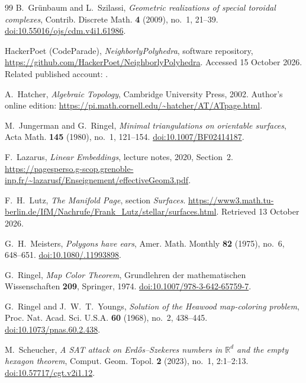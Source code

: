 \documentclass[11pt,reqno]{amsart}
\theoremstyle{plain}
\theoremstyle{definition}
\newcommand{\RR}{\mathbb{R}}
\begin{document}
\begin{thebibliography}{99}
B.~Grünbaum and L.~Szilassi,
\emph{Geometric realizations of special toroidal complexes},
Contrib. Discrete Math. \textbf{4} (2009), no.~1, 21--39.
\href{https://doi.org/10.55016/ojs/cdm.v4i1.61986}{doi:10.55016/ojs/cdm.v4i1.61986}.

HackerPoet (CodeParade), \emph{NeighborlyPolyhedra}, software repository,\newline
\url{https://github.com/HackerPoet/NeighborlyPolyhedra}.
Accessed 15 October 2026. Related published account: \cite{BokowskiKevin2025}.

A.~Hatcher, \emph{Algebraic Topology}, Cambridge University Press, 2002.
Author's online edition: \url{https://pi.math.cornell.edu/~hatcher/AT/ATpage.html}.

M.~Jungerman and G.~Ringel,
\emph{Minimal triangulations on orientable surfaces},
Acta Math. \textbf{145} (1980), no.~1, 121--154.
\href{https://doi.org/10.1007/BF02414187}{doi:10.1007/BF02414187}.

F.~Lazarus, \emph{Linear Embeddings}, lecture notes, 2020, Section~2.
\url{https://pagesperso.g-scop.grenoble-inp.fr/~lazarusf/Enseignement/effectiveGeom3.pdf}.

F.~H.~Lutz, \emph{The Manifold Page}, section \emph{Surfaces}.
\url{https://www3.math.tu-berlin.de/IfM/Nachrufe/Frank_Lutz/stellar/surfaces.html}.
Retrieved 13 October 2026.

G.~H.~Meisters, \emph{Polygons have ears},
Amer. Math. Monthly \textbf{82} (1975), no.~6, 648--651.
\href{https://doi.org/10.1080/00029890.1975.11993898}{doi:10.1080/.11993898}.

G.~Ringel, \emph{Map Color Theorem},
Grundlehren der mathematischen Wissenschaften \textbf{209}, Springer, 1974.
\href{https://doi.org/10.1007/978-3-642-65759-7}{doi:10.1007/978-3-642-65759-7}.

G.~Ringel and J.~W.~T.~Youngs,
\emph{Solution of the Heawood map-coloring problem},
Proc. Nat. Acad. Sci. U.S.A. \textbf{60} (1968), no.~2, 438--445.
\href{https://doi.org/10.1073/pnas.60.2.438}{doi:10.1073/pnas.60.2.438}.

M.~Scheucher,
\emph{A SAT attack on Erd\H{o}s--Szekeres numbers in $\RR^d$ and the empty hexagon theorem},
Comput. Geom. Topol. \textbf{2} (2023), no.~1, 2:1--2:13.
\href{https://doi.org/10.57717/cgt.v2i1.12}{doi:10.57717/cgt.v2i1.12}.


\end{thebibliography}
\end{document}
